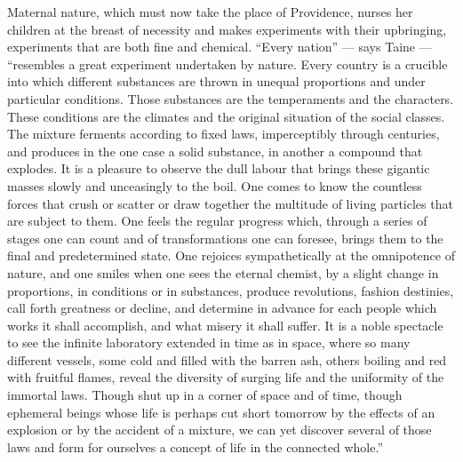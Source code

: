 \documentclass[12pt,a4paper,openany]{book}
\newcommand{\opage}[1]{\marginnote{\footnotesize\textit{[#1]}}}
\begin{document}
Maternal nature, which must now take the place of Providence,
nurses her children at the breast of necessity
and makes experiments with their upbringing,
experiments that are both fine and chemical. ``Every
nation'' --- says Taine --- ``resembles a great experiment
undertaken by nature. Every country is a crucible
into which different substances are thrown in unequal proportions
and under particular conditions. Those substances
are the temperaments and the characters. These conditions
are the climates and the original situation of the social classes.
The mixture ferments according to fixed laws, imperceptibly
through centuries, and produces in the one
case a solid substance, in another a compound that
explodes. It is a pleasure to observe the dull
labour that brings these gigantic masses slowly
and unceasingly to the boil. One comes to know the countless
forces that crush or scatter or draw together
the multitude of living particles that are
subject to them. One feels the regular progress
which, through a series of stages one can count
and of transformations one can foresee, brings them to
the final and predetermined state. One rejoices
sympathetically at the omnipotence of nature, and one smiles
when one sees the eternal chemist, by a slight change
in proportions, in conditions or in substances,
produce revolutions, fashion destinies, call forth
greatness or decline, and determine in advance for each
people which works it shall accomplish, and what misery
it shall suffer. It is a noble spectacle to see the
\setcounter{footnote}{0}%
\opage{86}infinite laboratory extended in time as in space,
where so many different vessels, some cold and
filled with the barren ash, others boiling and red
with fruitful flames, reveal the diversity of surging life
and the uniformity of the immortal laws.
Though shut up in a corner of space and of time,
though ephemeral beings whose life is perhaps cut short tomorrow
by the effects of an explosion or by the accident
of a mixture, we can yet discover several
of those laws and form for ourselves a concept of life in the
connected whole.''
\end{document}
